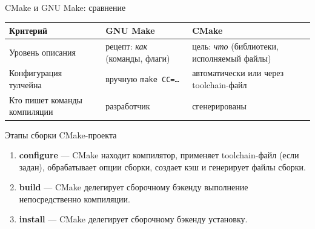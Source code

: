 \documentclass[compress, 8pt, aspectratio=169]{beamer}
\begin{document}
\begin{frame}{CMake и GNU Make: сравнение}

  \begin{center}

    \renewcommand{\arraystretch}{1.4}

    \begin{tabular}{|p{4.2cm}|p{4.2cm}|p{4.2cm}|}

      \hline

      \textbf{Критерий} & \textbf{GNU Make} & \textbf{CMake} \\

      \hline

      Уровень описания
        & рецепт: \textit{как} (команды, флаги)
        & цель: \textit{что} (библиотеки, исполняемый файлы) \\

      \hline

      Конфигурация тулчейна
        & вручную \texttt{make CC=\dots}
        & автоматически или через toolchain-файл \\

      \hline

      Кто пишет команды компиляции
        & разработчик
        & сгенерированы \\

      \hline

    \end{tabular}

  \end{center}

\end{frame}

\begin{frame}{Этапы сборки CMake-проекта}

  \begin{enumerate}

    \item \textbf{configure} --- CMake находит компилятор, применяет toolchain-файл
      (если задан), обрабатывает опции сборки, создает кэш и
      генерирует файлы сборки.

    \item \textbf{build} --- CMake делегирует сборочному бэкенду выполнение
      непосредственно компиляции.

    \item \textbf{install} --- CMake делегирует сборочному бэкенду установку.

  \end{enumerate}

\end{frame}
\end{document}
